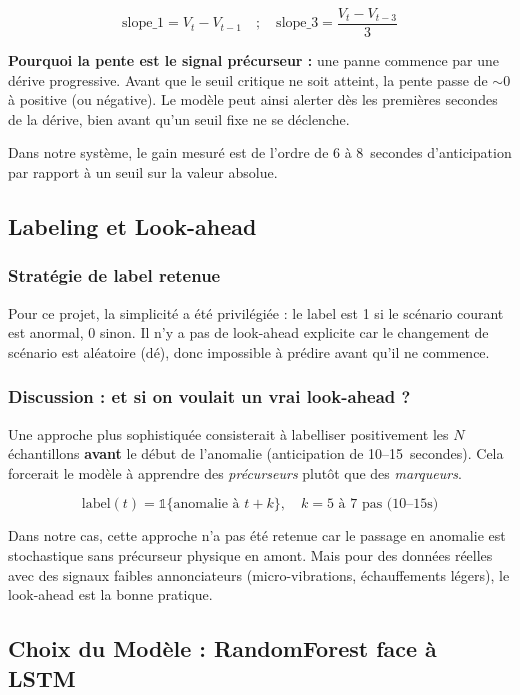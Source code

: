 \documentclass[11pt,a4paper]{article}
\begin{document}
\[
\text{slope\_1} = V_t - V_{t-1} \quad ; \quad \text{slope\_3} = \frac{V_t - V_{t-3}}{3}
\]

\textbf{Pourquoi la pente est le signal précurseur :} une panne commence par une dérive progressive. Avant que le seuil critique ne soit atteint, la pente passe de $\sim0$ à positive (ou négative). Le modèle peut ainsi alerter dès les premières secondes de la dérive, bien avant qu'un seuil fixe ne se déclenche. 

Dans notre système, le gain mesuré est de l'ordre de 6 à 8~secondes d'anticipation par rapport à un seuil sur la valeur absolue.

\subsection{Labeling et Look-ahead}

\subsubsection{Stratégie de label retenue}

Pour ce projet, la simplicité a été privilégiée : le label est 1 si le scénario courant est anormal, 0 sinon. Il n'y a pas de look-ahead explicite car le changement de scénario est aléatoire (dé), donc impossible à prédire avant qu'il ne commence.

\subsubsection{Discussion : et si on voulait un vrai look-ahead ?}

Une approche plus sophistiquée consisterait à labelliser positivement les $N$ échantillons \textbf{avant} le début de l'anomalie (anticipation de 10--15~secondes). Cela forcerait le modèle à apprendre des \emph{précurseurs} plutôt que des \emph{marqueurs}. 

\[
\text{label}(t) = \mathbb{1}\{\text{anomalie à } t + k\}, \quad k = 5 \text{ à } 7 \text{ pas (10--15s)}
\]

Dans notre cas, cette approche n'a pas été retenue car le passage en anomalie est stochastique sans précurseur physique en amont. Mais pour des données réelles avec des signaux faibles annonciateurs (micro-vibrations, échauffements légers), le look-ahead est la bonne pratique.

\subsection{Choix du Modèle : RandomForest face à LSTM}
\end{document}
